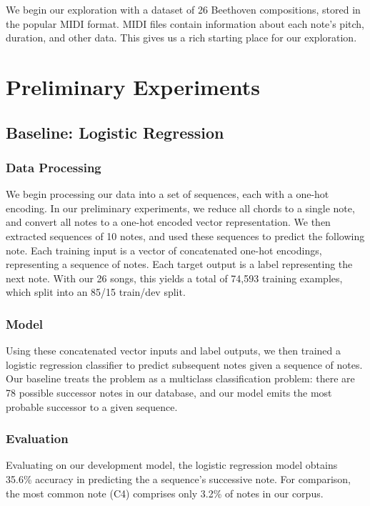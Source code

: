 \documentclass[twoside,twocolumn]{article}
\begin{document}
We begin our exploration with a dataset of 26 Beethoven compositions, stored in the popular MIDI format. MIDI files contain information about each note's pitch, duration, and other data. This gives us a rich starting place for our exploration.




\section{Preliminary Experiments}

\subsection{Baseline: Logistic Regression}

\subsubsection{Data Processing}
We begin processing our data into a set of sequences, each with a one-hot encoding. In our preliminary experiments, we reduce all chords to a single note, and convert all notes to a one-hot encoded vector representation. We then extracted sequences of 10 notes, and used these sequences to predict the following note. Each training input is a vector of concatenated one-hot encodings, representing a sequence of notes. Each target output is a label representing the next note. With our 26 songs, this yields a total of 74,593 training examples, which split into an 85/15 train/dev split.

\subsubsection{Model}
Using these concatenated vector inputs and label outputs, we then trained a logistic regression classifier to predict subsequent notes given a sequence of notes. Our baseline treats the problem as a multiclass classification problem: there are 78 possible successor notes in our database, and our model emits the most probable successor to a given sequence.

\subsubsection{Evaluation}
Evaluating on our development model, the logistic regression model obtains 35.6\% accuracy in predicting the a sequence's successive note. For comparison, the most common note (C4) comprises only 3.2\% of notes in our corpus.
\end{document}
